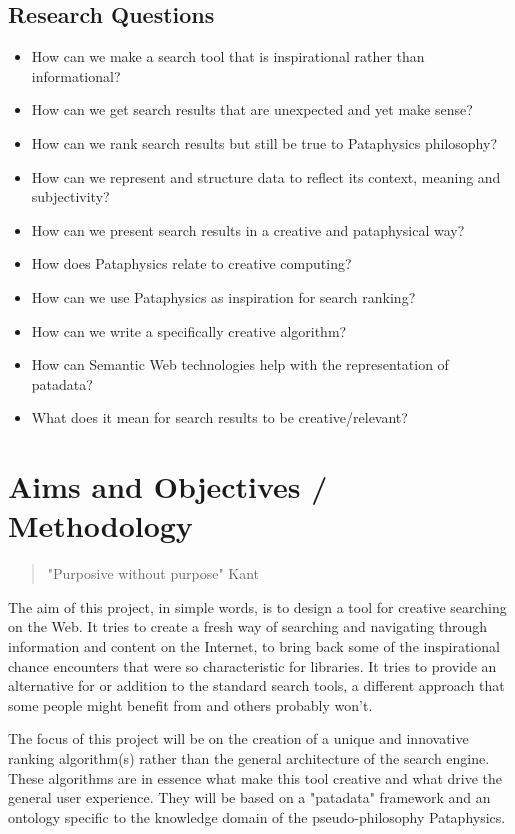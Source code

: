 \subsection{Research Questions}

\begin{itemize}
  \item How can we make a search tool that is inspirational rather than informational?
  \item How can we get search results that are unexpected and yet make sense?
  \item How can we rank search results but still be true to Pataphysics philosophy?
  \item How can we represent and structure data to reflect its context, meaning and subjectivity?
  \item How can we present search results in a creative and pataphysical way?
  \item How does Pataphysics relate to creative computing?
  \item How can we use Pataphysics as inspiration for search ranking?
  \item How can we write a specifically creative algorithm?
  \item How can Semantic Web technologies help with the representation of patadata?
  \item What does it mean for search results to be creative/relevant?
\end{itemize}

\section{Aims and Objectives / Methodology}

\begin{quote}
  "Purposive without purpose" Kant
\end{quote}

The aim of this project, in simple words, is to design a tool for creative searching on the Web. It tries to create a fresh way of searching and navigating through information and content on the Internet, to bring back some of the inspirational chance encounters that were so characteristic for libraries. It tries to provide an alternative for or addition to the standard search tools, a different approach that some people might benefit from and others probably won't.

The focus of this project will be on the creation of a unique and innovative ranking algorithm(s) rather than the general architecture of the search engine. These algorithms are in essence what make this tool creative and what drive the general user experience. They will be based on a "patadata" framework and an ontology specific to the knowledge domain of the pseudo-philosophy Pataphysics.

